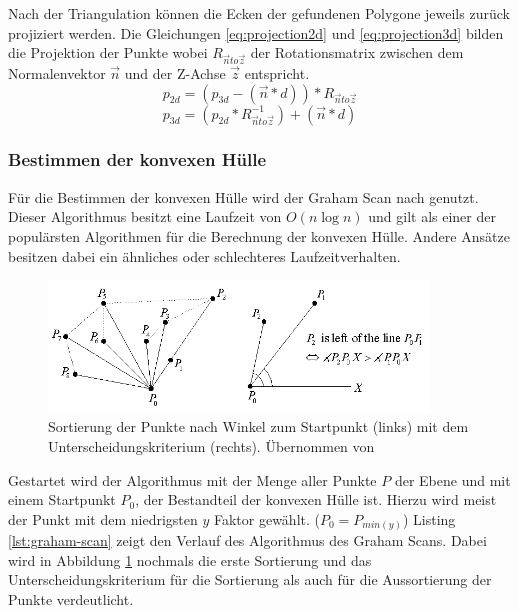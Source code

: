 Nach der Triangulation können die Ecken der gefundenen Polygone jeweils zurück projiziert werden. Die Gleichungen \ref{eq:projection2d} und \ref{eq:projection3d} bilden die Projektion der Punkte wobei \(R_{\vec{n}to\vec{z}}\) der Rotationsmatrix zwischen dem Normalenvektor \(\vec{n}\) und der Z-Achse \(\vec{z}\) entspricht.\\

\begin{equation} \label{eq:projection2d}
p_{2d} = (p_{3d} - (\vec{n}*d)) * R_{\vec{n}to\vec{z}}
\end{equation}
\begin{equation} \label{eq:projection3d}
p_{3d} = (p_{2d} * R_{\vec{n}to\vec{z}}^{-1}) + (\vec{n}*d)
\end{equation}

\subsubsection{Bestimmen der konvexen Hülle}

Für die Bestimmen der konvexen Hülle wird der Graham Scan nach \citet{graham1972efficient} genutzt. Dieser Algorithmus besitzt eine Laufzeit von \(O(n \log n)\) und gilt als einer der populärsten Algorithmen für die Berechnung der konvexen Hülle. Andere Ansätze besitzen dabei ein ähnliches oder schlechteres Laufzeitverhalten. \\

\begin{figure}[h]
  \centering
	\includegraphics[width=0.9\textwidth]{content/images/methods/convexhull.png} 
  \caption{Sortierung der Punkte nach Winkel zum Startpunkt (links) mit dem Unterscheidungskriterium (rechts). Übernommen von \citet{convexHull}}
  \label{fig:convexhull}
\end{figure}

Gestartet wird der Algorithmus mit der Menge aller Punkte \(P\) der Ebene und mit einem Startpunkt \(P_0\), der Bestandteil der konvexen Hülle ist. Hierzu wird meist der Punkt mit dem niedrigsten \(y\) Faktor gewählt. (\(P_0=P_{min(y)}\)) Listing \ref{lst:graham-scan} zeigt den Verlauf des Algorithmus des Graham Scans. Dabei wird in Abbildung \ref{fig:convexhull} nochmals die erste Sortierung und das Unterscheidungskriterium für die Sortierung als auch für die Aussortierung der Punkte verdeutlicht. \citep{convexHull} \\



